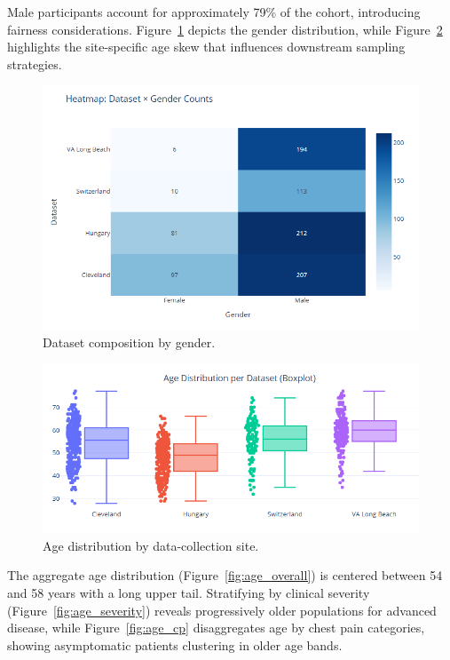 \documentclass[conference]{IEEEtran}
\begin{document}
Male participants account for approximately 79\% of the cohort, introducing fairness considerations. Figure~\ref{fig:gender} depicts the gender distribution, while Figure~\ref{fig:site} highlights the site-specific age skew that influences downstream sampling strategies.

\begin{figure}[t]
  \centering
  \includegraphics[width=0.85\linewidth]{dataset_composition_by_gender.png}
  \caption{Dataset composition by gender.}
  \label{fig:gender}
\end{figure}

\begin{figure}[t]
  \centering
  \includegraphics[width=0.85\linewidth]{age_distribution_by_dataset_site.png}
  \caption{Age distribution by data-collection site.}
  \label{fig:site}
\end{figure}

The aggregate age distribution (Figure~\ref{fig:age_overall}) is centered between 54 and 58 years with a long upper tail. Stratifying by clinical severity (Figure~\ref{fig:age_severity}) reveals progressively older populations for advanced disease, while Figure~\ref{fig:age_cp} disaggregates age by chest pain categories, showing asymptomatic patients clustering in older age bands.
\end{document}
